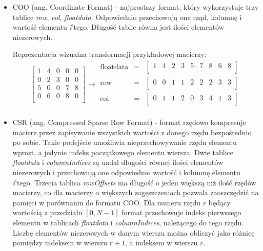 \begin{itemize}
    \item COO (ang. Coordinate Format) - najprostszy format, który wykorzystuje trzy tablice \textit{row}, \textit{col}, \textit{floatdata}.
    Odpowiednio przechowują one rząd, kolumnę i wartość elementu \textit{i}'tego.
    Długość tablic równa jest ilości elementów niezerowych.

    Reprezentacja wizualna transformacji przykładowej macierzy:
    \[
\left[
\begin{array}{ccccc}
    1 & 4 & 0 & 0 & 0\\ 
    0 & 2 & 3 & 0 & 0\\ 
    5 & 0 & 0 & 7 & 8\\ 
    0 & 6 & 0 & 8 & 0\\ 
\end{array}
\right]
\rightarrow
\begin{matrix}
\text{floatdata} & = & \begin{bmatrix}
1 & 4 & 2 & 3 & 5 & 7 & 8 & 6 & 8 \\
\end{bmatrix} \\
\text{row} & = & \begin{bmatrix}
0 & 0 & 1 & 1 & 2 & 2 & 2 & 3 & 3 \\
\end{bmatrix} \\
\text{col} & = & \begin{bmatrix}
0 & 1 & 1 & 2 & 0 & 3 & 4 & 1 & 3 \\
\end{bmatrix} \\
\end{matrix}
\]
    
    \item CSR (ang. Compressed Sparse Row Format) - format rzędowo kompresuje macierz przez zapisywanie wszystkich wartości z danego rzędu bezpośrednio po sobie.
    Takie podejście umożliwia nieprzechowywanie rzędu elementu wprost, a jedynie indeks początkowego elementu wiersza.
    Dwie tablice \textit{floatdata} i \textit{columnIndices} są nadal długości równej ilości elementów niezerowych i przechowują one odpowiednio wartość i kolumnę elementu \textit{i}'tego.
    Trzecia tablica \textit{rowOffsets} ma długość o jeden większą niż ilość rzędów macierzy, co dla macierzy o większych zagęszczeniach pozwala zaoszczędzić na pamięci w porównaniu do formatu COO.
    Dla numeru rzędu $r$ będący wartością z przedziału $[0, N-1]$ format przechowuje indeks pierwszego elementu w tablicach \textit{floatdata} i \textit{columnIndices}, należącego do tego rzędu.
    Liczbę elementów niezerowych w danym wierszu można obliczyć jako różnicę pomiędzy indeksem w wierszu $r+1$, a indeksem w wierszu $r$.


\end{itemize}
